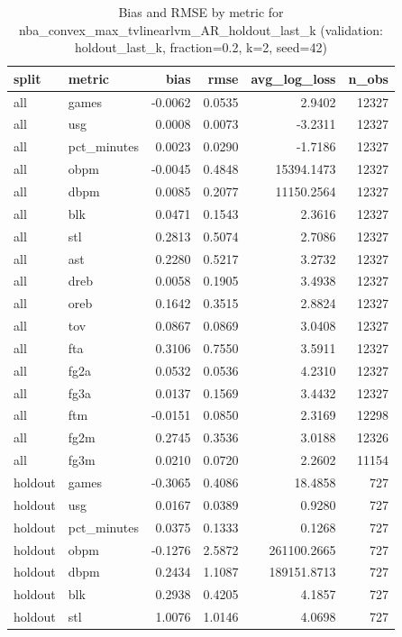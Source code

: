 \begin{table}
\caption{Bias and RMSE by metric for nba_convex_max_tvlinearlvm_AR_holdout_last_k (validation: holdout_last_k, fraction=0.2, k=2, seed=42)}
\label{tab:nba_convex_max_tvlinearlvm_AR_holdout_last_k_vs_holdout_last_k_f20_k2_s42_bias_rmse}
\begin{tabular}{llrrrr}
\toprule
split & metric & bias & rmse & avg\_log\_loss & n\_obs \\
\midrule
all & games & -0.0062 & 0.0535 & 2.9402 & 12327 \\
all & usg & 0.0008 & 0.0073 & -3.2311 & 12327 \\
all & pct\_minutes & 0.0023 & 0.0290 & -1.7186 & 12327 \\
all & obpm & -0.0045 & 0.4848 & 15394.1473 & 12327 \\
all & dbpm & 0.0085 & 0.2077 & 11150.2564 & 12327 \\
all & blk & 0.0471 & 0.1543 & 2.3616 & 12327 \\
all & stl & 0.2813 & 0.5074 & 2.7086 & 12327 \\
all & ast & 0.2280 & 0.5217 & 3.2732 & 12327 \\
all & dreb & 0.0058 & 0.1905 & 3.4938 & 12327 \\
all & oreb & 0.1642 & 0.3515 & 2.8824 & 12327 \\
all & tov & 0.0867 & 0.0869 & 3.0408 & 12327 \\
all & fta & 0.3106 & 0.7550 & 3.5911 & 12327 \\
all & fg2a & 0.0532 & 0.0536 & 4.2310 & 12327 \\
all & fg3a & 0.0137 & 0.1569 & 3.4432 & 12327 \\
all & ftm & -0.0151 & 0.0850 & 2.3169 & 12298 \\
all & fg2m & 0.2745 & 0.3536 & 3.0188 & 12326 \\
all & fg3m & 0.0210 & 0.0720 & 2.2602 & 11154 \\
holdout & games & -0.3065 & 0.4086 & 18.4858 & 727 \\
holdout & usg & 0.0167 & 0.0389 & 0.9280 & 727 \\
holdout & pct\_minutes & 0.0375 & 0.1333 & 0.1268 & 727 \\
holdout & obpm & -0.1276 & 2.5872 & 261100.2665 & 727 \\
holdout & dbpm & 0.2434 & 1.1087 & 189151.8713 & 727 \\
holdout & blk & 0.2938 & 0.4205 & 4.1857 & 727 \\
holdout & stl & 1.0076 & 1.0146 & 4.0698 & 727 \\

\end{tabular}
\end{table}
